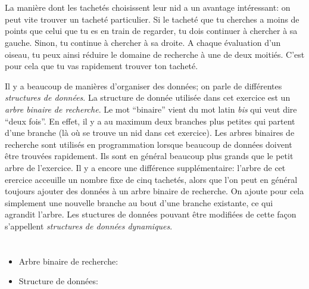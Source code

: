 {{%
\section*{\BrochureItsInformatics}
La manière dont les tachetés choisissent leur nid a un avantage intéressant: on peut vite trouver un tacheté particulier. Si le tacheté que tu cherches a moins de points que celui que tu es en train de regarder, tu dois continuer à chercher à sa gauche. Sinon, tu continue à chercher à sa droite. A chaque évaluation d’un oiseau, tu peux ainsi réduire le domaine de recherche à une de deux moitiés. C’est pour cela que tu vas rapidement trouver ton tacheté.

Il y a beaucoup de manières d’organiser des données; on parle de différentes \emph{structures de données}. La structure de donnée utilisée dans cet exercice est un \emph{arbre binaire de recherche}. Le mot “binaire” vient du mot latin \emph{bis} qui veut dire “deux fois”. En effet, il y a au maximum deux branches plus petites qui partent d’une branche (là où se trouve un nid dans cet exercice). Les arbres binaires de recherche sont utilisés en programmation lorsque beaucoup de données doivent être trouvées rapidement. Ils sont en général beaucoup plus grands que le petit arbre de l’exercice. Il y a encore une différence supplémentaire: l’arbre de cet erercice acceuille un nombre fixe de cinq tachetés, alors que l’on peut en général toujours ajouter des données à un arbre binaire de recherche. On ajoute pour cela simplement une nouvelle branche au bout d’une branche existante, ce qui agrandit l’arbre. Les stuctures de données pouvant être modifiées de cette façon s’appellent \emph{structures de données dynamiques}.



\section*{\BrochureWebsitesAndKeywords}
{\raggedright
\begin{itemize}
  \item Arbre binaire de recherche: \href{https://fr.wikipedia.org/wiki/Arbre_binaire_de_recherche}{}
  \item Structure de données: \href{https://fr.wikipedia.org/wiki/Structure_de_donn\%C3\%A9es}{}
\end{itemize}


}}}
